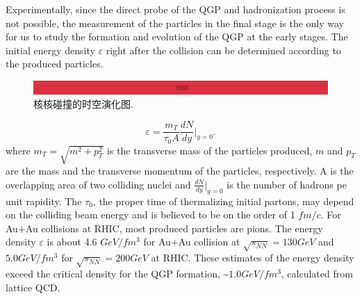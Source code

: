 Experimentally, since the direct probe of the QGP and hadronization process is not possible,
the measurement of the particles in the final stage is the only way for us to study the formation and evolution of the QGP at the early stages.
The initial energy density $\varepsilon$ right after the collision can be determined according to the produced particles.
\begin{figure}[hbtp]
  \centering
  \includegraphics[width=\linewidth]{pictures/pass.pdf}
  \caption{核核碰撞的时空演化图.}
  \label{fig:spaceTime}
\end{figure}
\begin{equation}
  \label{eq:S1}
  \varepsilon = \frac{m_{T}}{\tau_{0}A}\frac{dN}{dy}|_{y=0}.
\end{equation}
where $m_{T} = \sqrt{m^{2}+p_{T}^{2}}$ is the transverse mass of the particles produced,
$m$ and $p_{T}$ are the mass and the transverse momentum of the particles, respectively.
A is the overlapping area of two colliding nuclei and $\frac{dN}{dy}|_{y=0}$ is the number of hadrons pe unit rapidity.
The $\tau_{0}$, the proper time of thermalizing initial partons,
may depend on the colliding beam energy and is believed to be on the order of 1 $fm/c$.
For Au$+$Au collisions at RHIC,
most produced particles are pions.
The energy density $\varepsilon$ is about 4.6 $GeV/fm^{3}$ for Au$+$Au collision at $\sqrt{s_{NN}} = 130 GeV$ and $5.0 GeV/fm^{3}$ for $\sqrt{s_{NN}} = 200 GeV$ at RHIC.
These estimates of the energy density exceed the critical density for the QGP formation,
\~$1.0 GeV/fm^{3}$, calculated from lattice QCD.

